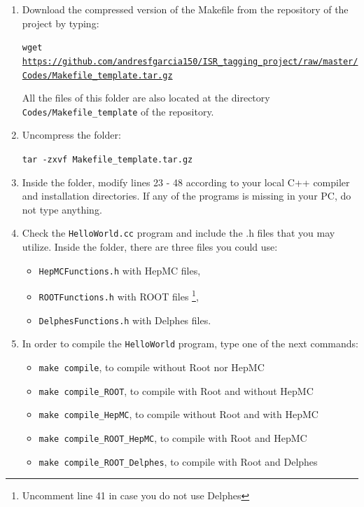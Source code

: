 \documentclass[12pt, oneside]{book}              %
\begin{document}
\begin{enumerate}
\item Download the compressed version of the Makefile from the repository
of the project by typing:

\texttt{wget \url{https://github.com/andresfgarcia150/ISR_tagging_project/raw/master/Codes/Makefile_template.tar.gz}}

All the files of this folder are also located at the directory \\
\texttt{Codes/Makefile\_template} of the repository.

\item Uncompress the folder:

\texttt{tar -zxvf Makefile\_template.tar.gz}

\item Inside the folder, modify lines 23 - 48 according to your local C++
compiler and installation directories. If any of the programs is missing 
in your PC, do not type anything.

\item Check the \texttt{HelloWorld.cc} program and include the .h files
that you may utilize. Inside the folder, there are three files you could use:

\begin{itemize}
\item \texttt{HepMCFunctions.h} with HepMC files,
\item \texttt{ROOTFunctions.h} with ROOT files \footnote{Uncomment line
 41 in case you do not use Delphes},
\item \texttt{DelphesFunctions.h} with Delphes files.
\end{itemize}

\item In order to compile the \texttt{HelloWorld} program, type one of 
the next commands:

\begin{itemize}
\item \texttt{make compile},                    to compile without Root nor HepMC
\item \texttt{make compile\_ROOT},              to compile with Root and without HepMC
\item \texttt{make compile\_HepMC},             to compile without Root and with HepMC
\item \texttt{make compile\_ROOT\_HepMC},       to compile with Root and HepMC
\item \texttt{make compile\_ROOT\_Delphes},     to compile with Root and Delphes
\end{itemize}

\end{enumerate}
\end{document}
